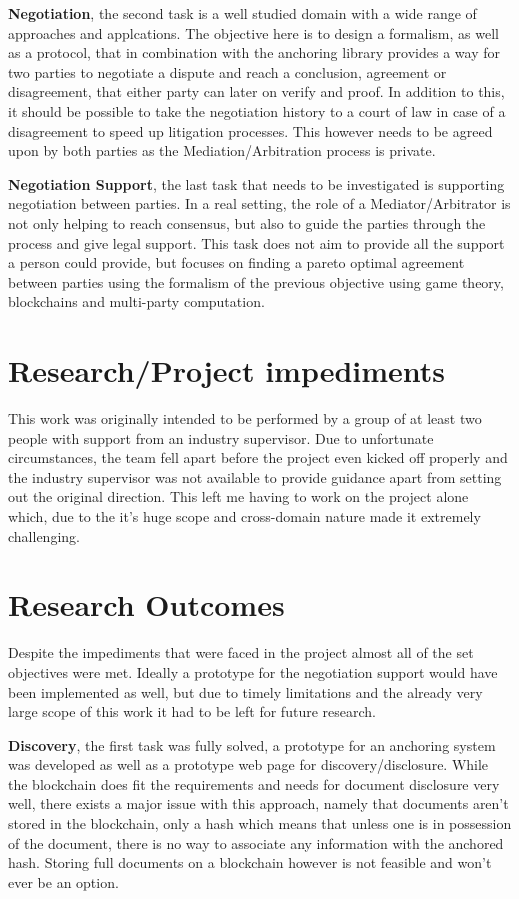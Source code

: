 \documentclass[12pt,msc,a4paper,oneside]{ucl_thesis}
\begin{document}
\textbf{Negotiation}, the second task is a well studied domain with a wide range of approaches and applcations. The objective here is to design a formalism, as well as a protocol, that in combination with the anchoring library provides a way for two parties to negotiate a dispute and reach a conclusion, agreement or disagreement, that either party can later on verify and proof. In addition to this, it should be possible to take the negotiation history to a court of law in case of a disagreement to speed up litigation processes. This however needs to be agreed upon by both parties as the Mediation/Arbitration process is private.

\textbf{Negotiation Support}, the last task that needs to be investigated is supporting negotiation between parties. In a real setting, the role of a Mediator/Arbitrator is not only helping to reach consensus, but also to guide the parties through the process and give legal support. This task does not aim to provide all the support a person could provide, but focuses on finding a pareto optimal agreement between parties using the formalism of the previous objective using game theory, blockchains and multi-party computation.

\section{Research/Project impediments}
This work was originally intended to be performed by a group of at least two people with support from an industry supervisor. Due to unfortunate circumstances, the team fell apart before the project even kicked off properly and the industry supervisor was not available to provide guidance apart from setting out the original direction. This left me having to work on the project alone which, due to the it's huge scope and cross-domain nature made it extremely challenging.

\section{Research Outcomes} \label{sec:research_outcomes}
Despite the impediments that were faced in the project almost all of the set objectives were met. Ideally a prototype for the negotiation support would have been implemented as well, but due to timely limitations and the already very large scope of this work it had to be left for future research.

\textbf{Discovery}, the first task was fully solved, a prototype for an anchoring system was developed as well as a prototype web page for discovery/disclosure. While the blockchain does fit the requirements and needs for document disclosure very well, there exists a major issue with this approach, namely that documents aren't stored in the blockchain, only a hash which means that unless one is in possession of the document, there is no way to associate any information with the anchored hash. Storing full documents on a blockchain however is not feasible and won't ever be an option.
\end{document}
